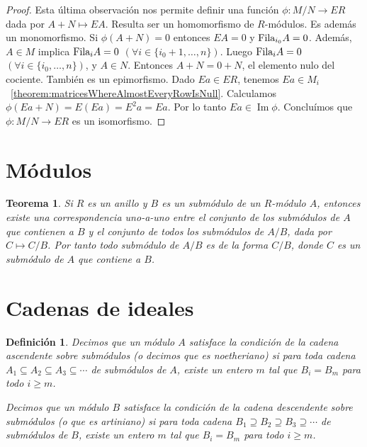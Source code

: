 \documentclass{report}
\newcommand{\Fila}{\textnormal{Fila}}
\DeclareMathOperator{\image}{\text{Im}}
\newtheorem{theorem}{Teorema}
\newtheorem{definition}{Definición}
\begin{document}
\begin{proof}
    Esta última observación nos permite definir una función \(\phi : M / N \rightarrow E R\) dada por \(A + N \mapsto E A\).
    Resulta ser un homomorfismo de \(R\)-módulos.
    Es además un monomorfismo.
    Si \(\phi(A + N) = 0\) entonces \(E A = 0\) y \(\Fila_{i_0} A = 0\).
    Además, \(A \in M\) implica \(\Fila_i A = 0\) \((\forall i \in \{i_0 + 1, \dots, n\})\).
    Luego \(\Fila_i A = 0\) \((\forall i \in \{i_0, \dots, n\})\), y \(A \in N\).
    Entonces \(A + N = 0 + N\), el elemento nulo del cociente.
    También es un epimorfismo.
    Dado \(E a \in E R\), tenemos \(E a \in M_i\)~\ref{theorem:matricesWhereAlmostEveryRowIsNull}.
    Calculamos \(\phi(E a + N) = E (E a) = E^2 a = E a\).
    Por lo tanto \(E a \in \image \phi\).
    Concluímos que \(\phi : M / N \rightarrow E R\) es un isomorfismo.
  \end{proof}

  \section{Módulos}
  \begin{theorem}\label{theorem:submodulesOfQuotientModule}
    Si \(R\) es un anillo y \(B\) es un submódulo de un \(R\)-módulo \(A\), entonces existe una correspondencia uno-a-uno entre el conjunto de los submódulos de \(A\) que contienen a \(B\) y el conjunto de todos los submódulos de \(A / B\), dada por \(C \mapsto C / B\).
    Por tanto todo submódulo de \(A / B\) es de la forma \(C / B\), donde \(C\) es un submódulo de \(A\) que contiene a \(B\).
  \end{theorem}


  \section{Cadenas de ideales}

  \begin{definition}
    Decimos que un módulo \(A\) satisface la \emph{condición de la cadena ascendente sobre submódulos} (o decimos que es \emph{noetheriano}) si para toda cadena \(A_1 \subseteq A_2 \subseteq A_3 \subseteq \cdots\) de submódulos de \(A\), existe un entero \(m\) tal que \(B_i = B_m\) para todo \(i \geq m\).

    Decimos que un módulo \(B\) satisface la \emph{condición de la cadena descendente sobre submódulos} (o que es \emph{artiniano}) si para toda cadena \(B_1 \supseteq B_2 \supseteq B_3 \supseteq \cdots\) de submódulos de \(B\), existe un entero \(m\) tal que \(B_i = B_m\) para todo \(i \geq m\).
  \end{definition}
\end{document}
